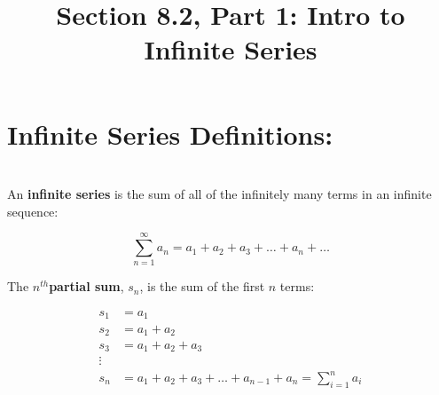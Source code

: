 \documentclass[10pt]{article}
\begin{document}
\newcommand{\an}{\lbrace a_n \rbrace}
\newcommand{\sn}{\lbrace s_n\rbrace}
\newcommand{\Sum}{\sum_{n=1}^\infty }

\everymath{\displaystyle}

\renewcommand{\myTitle}{\vspace*{-.25in}	MATH 1336: Calculus III}

\renewcommand{\mySubTitle}{Section 8.2, Part 1: Intro to Infinite Series}



\title{\mySubTitle}\date{}
\maketitle

\hspace*{-.8in}%

\setlength{\columnseprule}{.4pt}
\setlength{\columnsep}{3em}



\section*{Infinite Series Definitions: }~\\
An \textbf{infinite series} is the sum of all of the infinitely many terms in an infinite sequence:

\[
\Sum a_n = a_1 + a_2 + a_3 + \ldots + a_n + \ldots
\]

The \(n^{th}\)\textbf{partial sum}, \(s_n\), is the sum of the first \(n\) terms:


\begin{align*}
s_1 &= a_1\\
s_2 &= a_1 + a_2\\
s_3 & = a_1 + a_2 + a_3\\
\vdots &\\
s_n & = a_1 + a_2 + a_3+ \ldots + a_{n-1} + a_n = \sum_{i=1}^{n} a_i
\end{align*}
\end{document}

